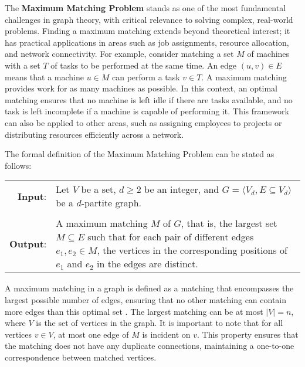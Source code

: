 The \textbf{Maximum Matching Problem} stands as one of the most fundamental challenges in graph theory, with critical relevance to solving complex, real-world problems. Finding a maximum matching extends beyond theoretical interest; it has practical applications in areas such as job assignments, resource allocation, and network connectivity. For example, consider matching a set \( M \) of machines with a set \( T \) of tasks to be performed at the same time. An edge \((u, v) \in E\) means that a machine \( u \in M \) can perform a task \( v \in T \). A maximum matching provides work for as many machines as possible. In this context, an optimal matching ensures that no machine is left idle if there are tasks available, and no task is left incomplete if a machine is capable of performing it. This framework can also be applied to other areas, such as assigning employees to projects or distributing resources efficiently across a network.



The formal definition of the Maximum Matching Problem can be stated as follows:

\begin{center}
    \begin{tabular}{rl} %
        \textbf{Input}: & Let \(V\) be a set, \(d \geq 2\) be an integer, and \(G = \langle V_d, E \subseteq V_d \rangle\) be a \(d\)-partite graph. \\
        \\
        \textbf{Output}: & \begin{minipage}[t]{0.7\textwidth}
        A maximum matching \(M\) of \(G\), that is, the largest set \(M \subseteq E\) such that for each pair of different edges \(e_1, e_2 \in M\), the vertices in the corresponding positions of \(e_1\) and \(e_2\) in the edges are distinct.
        \end{minipage}
    \end{tabular}
\end{center}

A maximum matching in a graph is defined as a matching that encompasses the largest possible number of edges, ensuring that no other matching can contain more edges than this optimal set \cite{cormen2009introduction}. The largest matching can be at most \( |V| = n \), where \( V \) is the set of vertices in the graph. It is important to note that for all vertices \( v \in V \), at most one edge of \( M \) is incident on \( v \). This property ensures that the matching does not have any duplicate connections, maintaining a one-to-one correspondence between matched vertices. 

